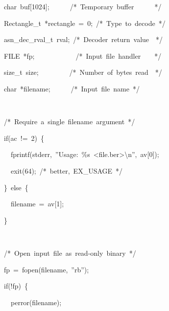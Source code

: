 \documentclass[english,oneside,12pt]{book}
\newenvironment{lyxcode}
{\par\begin{list}{}{
\setlength{\rightmargin}{\leftmargin}
\setlength{\listparindent}{0pt}%
\raggedright
\setlength{\itemsep}{0pt}
\setlength{\parsep}{0pt}
\normalfont\ttfamily}%
 \item[]}
{\end{list}}
\begin{document}
\begin{enumerate}
\begin{lyxcode}
{\small{}~~~~char~buf{[}1024{]};~~~~~~/{*}~Temporary~buffer~~~~~~{*}/}{\small \par}

{\small{}~~~~Rectangle\_t~{*}rectangle~=~0;~/{*}~Type~to~decode~{*}/}{\small \par}

{\small{}~~~~asn\_dec\_rval\_t~rval;~/{*}~Decoder~return~value~~{*}/}{\small \par}

{\small{}~~~~FILE~{*}fp;~~~~~~~~~~~~/{*}~Input~file~handler~~~~{*}/}{\small \par}

{\small{}~~~~size\_t~size;~~~~~~~~~/{*}~Number~of~bytes~read~~{*}/}{\small \par}

{\small{}~~~~char~{*}filename;~~~~~~/{*}~Input~file~name~{*}/}{\small \par}

{\small{}~}{\small \par}

{\small{}~~~~/{*}~Require~a~single~filename~argument~{*}/}{\small \par}

{\small{}~~~~if(ac~!=~2)~\{}{\small \par}

{\small{}~~~~~~fprintf(stderr,~''Usage:~\%s~<file.ber>\textbackslash{}n'',~av{[}0{]});}{\small \par}

{\small{}~~~~~~exit(64);~/{*}~better,~EX\_USAGE~{*}/}{\small \par}

{\small{}~~~~\}~else~\{}{\small \par}

{\small{}~~~~~~filename~=~av{[}1{]};}{\small \par}

{\small{}~~~~\}}{\small \par}

{\small{}~}{\small \par}

{\small{}~~~~/{*}~Open~input~file~as~read-only~binary~{*}/}{\small \par}

{\small{}~~~~fp~=~fopen(filename,~''rb'');}{\small \par}

{\small{}~~~~if(!fp)~\{}{\small \par}

{\small{}~~~~~~perror(filename);}{\small \par}


\end{lyxcode}
\end{enumerate}
\end{document}
